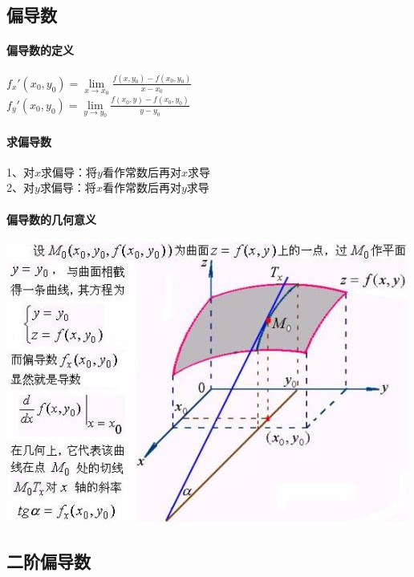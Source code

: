 \documentclass{article}
\begin{document}
\begin{flushleft}
	\subsection{偏导数}
	\paragraph{偏导数的定义}
	$f_x'(x_0,y_0)=\lim\limits_{x\to x_0}\frac{f(x,y_0)-f(x_0,y_0)}{x-x_0}$\\
	$f_y'(x_0,y_0)=\lim\limits_{y\to y_0}\frac{f(x_0,y)-f(x_0,y_0)}{y-y_0}$\\
	
	\paragraph{求偏导数}
	1、对$x$求偏导：将$y$看作常数后再对$x$求导\\
	2、对$y$求偏导：将$x$看作常数后再对$y$求导\\
	
	\paragraph{偏导数的几何意义}
	\includegraphics[scale=1.0]{pdsjhyy.jpg}
	
	\subsection{二阶偏导数}
	
	
\end{flushleft}
\end{document}
